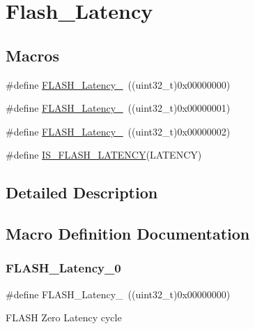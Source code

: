 \hypertarget{group___flash___latency}{}\section{Flash\+\_\+\+Latency}
\label{group___flash___latency}
\subsection*{Macros}
\begin{DoxyCompactItemize}
\item 
\#define \mbox{\hyperlink{group___flash___latency_ga09afe6e52b819cc074f6111ec42ac3c3}{F\+L\+A\+S\+H\+\_\+\+Latency\+\_}}~((uint32\+\_\+t)0x00000000)
\item 
\#define \mbox{\hyperlink{group___flash___latency_ga6b7281665340fe8f7919bdfcfd06f8e6}{F\+L\+A\+S\+H\+\_\+\+Latency\+\_}}~((uint32\+\_\+t)0x00000001)
\item 
\#define \mbox{\hyperlink{group___flash___latency_ga55173ebb5c978459ce18d5e2516e3e89}{F\+L\+A\+S\+H\+\_\+\+Latency\+\_}}~((uint32\+\_\+t)0x00000002)
\item 
\#define \mbox{\hyperlink{group___flash___latency_gafcbd098d482318a622a58bf168547389}{I\+S\+\_\+\+F\+L\+A\+S\+H\+\_\+\+L\+A\+T\+E\+N\+CY}}(L\+A\+T\+E\+N\+CY)
\end{DoxyCompactItemize}


\subsection{Detailed Description}


\subsection{Macro Definition Documentation}
\mbox{\label{group___flash___latency_ga09afe6e52b819cc074f6111ec42ac3c3}} 
\subsubsection{\texorpdfstring{FLASH\_Latency\_0}{FLASH\_Latency\_0}}
{\footnotesize\ttfamily \#define F\+L\+A\+S\+H\+\_\+\+Latency\+\_~((uint32\+\_\+t)0x00000000)}

F\+L\+A\+SH Zero Latency cycle \mbox{\label{group___flash___latency_ga6b7281665340fe8f7919bdfcfd06f8e6}} 
